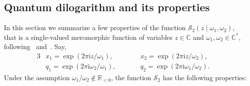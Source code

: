 \documentclass[pdftex]{sigma}
\numberwithin{equation}{section}
\begin{document}
\subsection{Quantum dilogarithm and its properties}\label{appendix:qdilog}
In this section we summarize a few properties of the function $\mathcal{S}_2(z\mid \omega_1,\omega_2)$, that is a single-valued meromorphic function of variables $z\in\mathbb{C}$ and $\omega_1,\omega_2 \in \mathbb{C}^*$, following~\cite[Section~4]{BridgelandCon} and~\cite{Narukawa}. Say,
\begin{alignat*}{3}
& x_1= \exp (2\pi \mathrm{i} z/\omega_1), \qquad && x_2= \exp (2\pi \mathrm{i} z/\omega_2), &\\
& q_1= \exp (2\pi \mathrm{i} \omega_2/\omega_1), \qquad && q_2= \exp (2\pi \mathrm{i} \omega_1/\omega_2).&
\end{alignat*}
Under the assumption $\omega_1/\omega_2\notin \mathbb{R}_{<0}$, the function $\mathcal{S}_2$ has the following properties:
\end{document}
